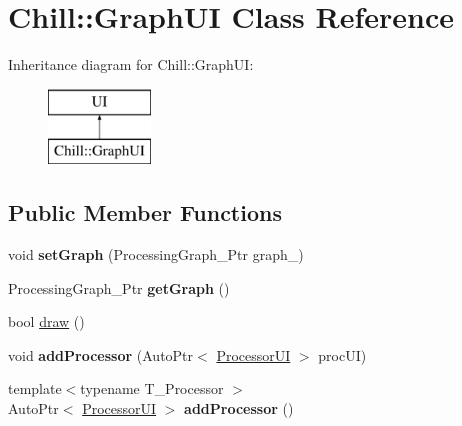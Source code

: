 \hypertarget{class_chill_1_1_graph_u_i}{}\section{Chill\+:\+:Graph\+UI Class Reference}
\label{class_chill_1_1_graph_u_i}
Inheritance diagram for Chill\+:\+:Graph\+UI\+:\begin{figure}[H]
\begin{center}
\leavevmode
\includegraphics[height=2.000000cm]{class_chill_1_1_graph_u_i}
\end{center}
\end{figure}
\subsection*{Public Member Functions}
\begin{DoxyCompactItemize}
\item 
\mbox{\label{class_chill_1_1_graph_u_i_a781b4cb94cd335f2a16c7ed2a8ee1bdc}} 
void {\bfseries set\+Graph} (Processing\+Graph\+\_\+\+Ptr graph\+\_\+)
\item 
\mbox{\label{class_chill_1_1_graph_u_i_ae7b96d16ed39fe3dc846f08c8120284e}} 
Processing\+Graph\+\_\+\+Ptr {\bfseries get\+Graph} ()
\item 
bool \mbox{\hyperlink{class_chill_1_1_graph_u_i_a0baf2bbeaab0062cee7f3b7d2136bced}{draw}} ()
\item 
\mbox{\label{class_chill_1_1_graph_u_i_af32cacb69a048520dd5c961798f8f790}} 
void {\bfseries add\+Processor} (Auto\+Ptr$<$ \mbox{\hyperlink{class_chill_1_1_processor_u_i}{Processor\+UI}} $>$ proc\+UI)
\item 
\mbox{\label{class_chill_1_1_graph_u_i_a5b5b9a8b41d7a654bd4e7ad1f6dc332f}} 
{\footnotesize template$<$typename T\+\_\+\+Processor $>$ }\\Auto\+Ptr$<$ \mbox{\hyperlink{class_chill_1_1_processor_u_i}{Processor\+UI}} $>$ {\bfseries add\+Processor} ()
\end{DoxyCompactItemize}
